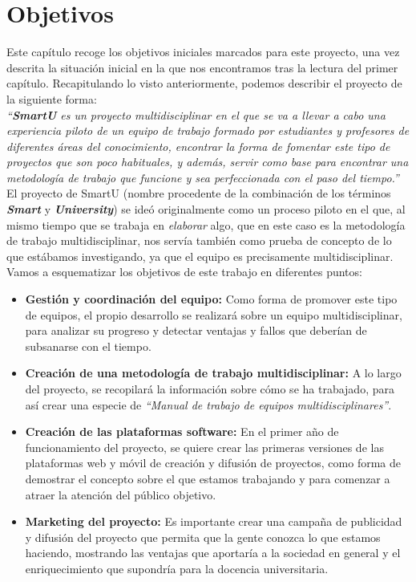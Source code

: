 \chapter{Objetivos}
\label{ch:objetivos}

Este capítulo recoge los objetivos iniciales marcados para este proyecto, una vez descrita la situación inicial en la que nos encontramos tras la lectura del primer capítulo. Recapitulando lo visto anteriormente, podemos describir el proyecto de la siguiente forma:\\

\textit{``\textbf{SmartU} es un proyecto multidisciplinar en el que se va a llevar a cabo una experiencia piloto de un equipo de trabajo formado por estudiantes y profesores de diferentes áreas del conocimiento, encontrar la forma de fomentar este tipo de proyectos que son poco habituales, y además, servir como base para encontrar una metodología de trabajo que funcione y sea perfeccionada con el paso del tiempo.''}\\

El proyecto de SmartU (nombre procedente de la combinación de los términos \textit{\textbf{Smart}} y \textit{\textbf{University}}) se ideó originalmente como un proceso piloto en el que, al mismo tiempo que se trabaja en \textit{elaborar} algo, que en este caso es la metodología de trabajo multidisciplinar, nos servía también como prueba de concepto de lo que estábamos investigando, ya que el equipo es precisamente multidisciplinar.\\

Vamos a esquematizar los objetivos de este trabajo en diferentes puntos:

\begin{itemize}
    \item \textbf{Gestión y coordinación del equipo:} Como forma de promover este tipo de equipos, el propio desarrollo se realizará sobre un equipo multidisciplinar, para analizar su progreso y detectar ventajas y fallos que deberían de subsanarse con el tiempo.
    \item \textbf{Creación de una metodología de trabajo multidisciplinar:} A lo largo del proyecto, se recopilará la información sobre cómo se ha trabajado, para así crear una especie de \textit{``Manual de trabajo de equipos multidisciplinares''}.
    \item \textbf{Creación de las plataformas software:} En el primer año de funcionamiento del proyecto, se quiere crear las primeras versiones de las plataformas web y móvil de creación y difusión de proyectos, como forma de demostrar el concepto sobre el que estamos trabajando y para comenzar a atraer la atención del público objetivo.
    \item \textbf{Marketing del proyecto:} Es importante crear una campaña de publicidad y difusión del proyecto que permita que la gente conozca lo que estamos haciendo, mostrando las ventajas que aportaría a la sociedad en general y el enriquecimiento que supondría para la docencia universitaria.
\end{itemize}


